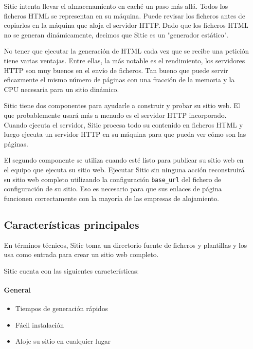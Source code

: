 Sitic intenta llevar el almacenamiento en caché un paso más allá. Todos los ficheros HTML se representan en su máquina.
Puede revisar los ficheros antes de copiarlos en la máquina que aloja el servidor HTTP. Dado que los ficheros HTML
no se generan dinámicamente, decimos que Sitic es un "generador estático".

No tener que ejecutar la generación de HTML cada vez que se recibe una petición tiene varias ventajas. Entre ellas,
la más notable es el rendimiento, los servidores HTTP son muy buenos en el envío de ficheros. Tan bueno que puede
servir eficazmente el mismo número de páginas con una fracción de la memoria y la CPU necesaria para un sitio dinámico.

Sitic tiene dos componentes para ayudarle a construir y probar su sitio web. El que probablemente usará más a menudo es el
servidor HTTP incorporado. Cuando ejecuta el servidor, Sitic procesa todo su contenido en ficheros HTML y luego ejecuta
un servidor HTTP en su máquina para que pueda ver cómo son las páginas.

El segundo componente se utiliza cuando esté listo para publicar su sitio web en el equipo que ejecuta su sitio web.
Ejecutar Sitic sin ninguna acción reconstruirá su sitio web completo utilizando la configuración \texttt{base\_url} del fichero de
configuración de su sitio. Eso es necesario para que sus enlaces de página funcionen correctamente con la mayoría
de las empresas de alojamiento.

\subsection{Características principales}

En términos técnicos, Sitic toma un directorio fuente de ficheros y plantillas y los usa como entrada para crear un sitio web completo.

Sitic cuenta con las siguientes características:

\paragraph{General}

\begin{itemize}
\item Tiempos de generación rápidos
\item Fácil instalación
\item Aloje su sitio en cualquier lugar
\end{itemize}


